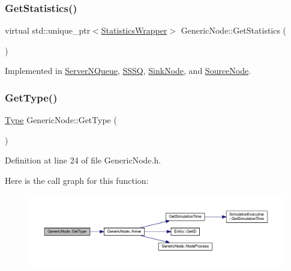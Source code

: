 \mbox{\label{class_generic_node_ae7c8424c8c14fd3de993c902d78deb67}} 
\subsubsection{\texorpdfstring{Get\+Statistics()}{GetStatistics()}}
{\footnotesize\ttfamily virtual std\+::unique\+\_\+ptr$<$\hyperlink{class_generic_node_1_1_statistics_wrapper}{Statistics\+Wrapper}$>$ Generic\+Node\+::\+Get\+Statistics (\begin{DoxyParamCaption}{ }\end{DoxyParamCaption})\hspace{0.3cm}{\ttfamily [pure virtual]}}



Implemented in \hyperlink{class_server_n_queue_a18718f3796f33fa0f9d9100c34a6a7dc}{Server\+N\+Queue}, \hyperlink{class_s_s_s_q_ad8f307b8a4609d28efcc122dddfe5120}{S\+S\+SQ}, \hyperlink{class_sink_node_ad6aeb0857d3ddd9511cd5d24974e1fac}{Sink\+Node}, and \hyperlink{class_source_node_a0aea882fe808d9da6d506653be166e73}{Source\+Node}.

\mbox{\label{class_generic_node_a270cafd4814f236ad503b02cd99339e0}} 
\subsubsection{\texorpdfstring{Get\+Type()}{GetType()}}
{\footnotesize\ttfamily \hyperlink{class_generic_node_a9e7985ab9bbfa1c85091adc0ab71a6b6}{Type} Generic\+Node\+::\+Get\+Type (\begin{DoxyParamCaption}{ }\end{DoxyParamCaption})\hspace{0.3cm}{\ttfamily [inline]}}



Definition at line 24 of file Generic\+Node.\+h.

Here is the call graph for this function\+:
\nopagebreak
\begin{figure}[H]
\begin{center}
\leavevmode
\includegraphics[width=350pt]{class_generic_node_a270cafd4814f236ad503b02cd99339e0_cgraph}
\end{center}
\end{figure}
\mbox{\label{class_generic_node_ae942258a57f211072d179da470579add}} 
